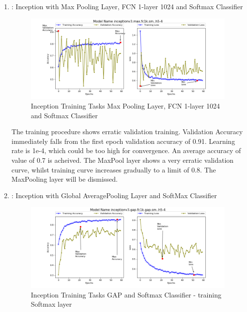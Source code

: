 \documentclass{article}
\begin{document}
\begin{enumerate}

\item: Inception with Max Pooling Layer, FCN 1-layer 1024 and Softmax Classifier


\begin{figure}[H]
\centering
\label{fig:incv3-sm}
\includegraphics[scale=0.6]{images/t1-i3-fc1k-sm-4.png}
\caption{Inception Training Tasks Max Pooling Layer, FCN 1-layer 1024 and Softmax Classifier}
\end{figure}

The training procedure shows erratic validation training. Validation Accuracy immediately falls from the first epoch validation accuracy of 0.91. Learning rate is 1e-4, which could be too high for convergence. An average accuracy of value of 0.7 is acheived. The MaxPool layer shows a very erratic validation curve, whilst training curve increases gradually to a limit of 0.8. The MaxPooling layer will be dismissed.

\item: Inception with Global AveragePooling Layer and SoftMax Classifier
\begin{figure}[H]
\centering
\label{fig:incv3-gap-4}
\includegraphics[scale=0.6]{images/t1-i3-gap-sm-4.png}
\caption{Inception Training Tasks GAP and Softmax Classifier - training Softmax layer}
\end{figure}


\end{enumerate}
\end{document}
